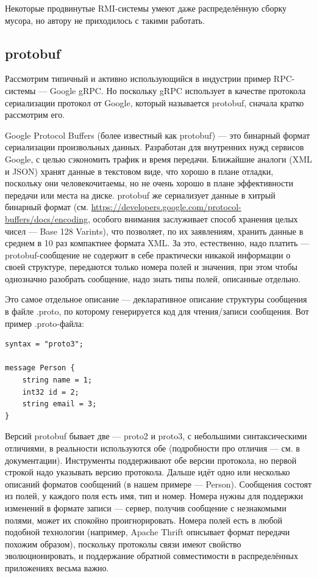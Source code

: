 \documentclass{../../text-style}
\begin{document}
Некоторые продвинутые RMI-системы умеют даже распределённую сборку мусора, но автору не приходилось с такими работать.

\subsection{protobuf}

Рассмотрим типичный и активно использующийся в индустрии пример RPC-системы --- Google gRPC. Но поскольку gRPC использует в качестве протокола сериализации протокол от Google, который называется protobuf, сначала кратко рассмотрим его.

Google Protocol Buffers (более известный как protobuf) --- это бинарный формат сериализации произвольных данных. Разработан для внутренних нужд сервисов Google, с целью сэкономить трафик и время передачи. Ближайшие аналоги (XML и JSON) хранят данные в текстовом виде, что хорошо в плане отладки, поскольку они человекочитаемы, но не очень хорошо в плане эффективности передачи или места на диске. protobuf же сериализует данные в хитрый бинарный формат (см. \url{https://developers.google.com/protocol-buffers/docs/encoding}, особого внимания заслуживает способ хранения целых чисел --- Base 128 Varints), что позволяет, по их заявлениям, хранить данные в среднем в 10 раз компактнее формата XML. За это, естественно, надо платить --- protobuf-сообщение не содержит в себе практически никакой информации о своей структуре, передаются только номера полей и значения, при этом чтобы однозначно разобрать сообщение, надо знать типы полей, описанные отдельно.

Это самое отдельное описание --- декларативное описание структуры сообщения в файле .proto, по которому генерируется код для чтения/записи сообщения. Вот пример .proto-файла:

\begin{verbatim}
syntax = "proto3";

message Person {
    string name = 1;
    int32 id = 2;
    string email = 3;
}
\end{verbatim}

Версий protobuf бывает две --- proto2 и proto3, с небольшими синтаксическими отличиями, в реальности используются обе (подробности про отличия --- см. в документации). Инструменты поддерживают обе версии протокола, но первой строкой надо указывать версию протокола. Дальше идёт одно или несколько описаний форматов сообщений (в нашем примере --- Person). Сообщения состоят из полей, у каждого поля есть имя, тип и номер. Номера нужны для поддержки изменений в формате записи --- сервер, получив сообщение с незнакомыми полями, может их спокойно проигнорировать. Номера полей есть в любой подобной технологии (например, Apache Thrift описывает формат передачи похожим образом), поскольку протоколы связи имеют свойство эволюционировать, и поддержание обратной совместимости в распределённых приложениях весьма важно.
\end{document}
